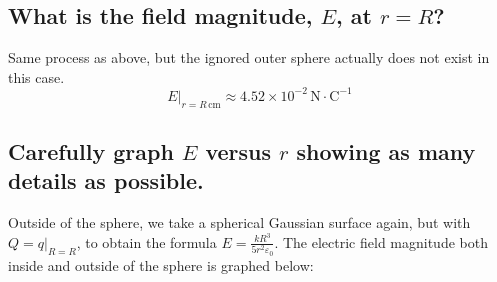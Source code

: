 \documentclass[a4paper]{scrartcl}
\begin{document}
\subsection{What is the field magnitude, \(E\), at \(r = R\)?}
Same process as above, but the ignored outer sphere actually does not exist in this case.
\[E\bigg|_{r=R\,\mathrm{cm}} \approx 4.52 \times 10^{-2}\,\mathrm{N \cdot C^{-1}}\]

\subsection{Carefully graph \(E\) versus \(r\) showing as many details as possible.}
Outside of the sphere, we take a spherical Gaussian surface again, but with \(Q = q\big|_{R = R}\), to obtain the formula \(E = \frac{k R^3}{5 r^2 \varepsilon_0}\). The electric field magnitude both inside and outside of the sphere is graphed below:

\begin{figure}[h]
    \centering
\end{figure}
\end{document}
